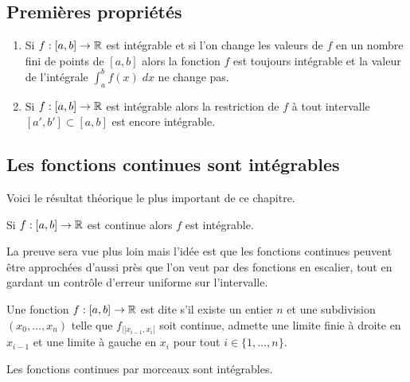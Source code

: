 \documentclass[class=report,crop=false]{standalone}
\begin{document}
\subsection{Premières propriétés}

\begin{proposition}
\label{prop:intprop}
\sauteligne
\begin{enumerate}
  \item Si $f : [a,b] \to \mathbb{R}$ est intégrable et si l'on change les valeurs de $f$
en un nombre fini de points de $[a,b]$ alors la fonction $f$ est
toujours intégrable et la valeur de l'intégrale $\int_a^b f(x)\; dx$ ne change pas.

  \item Si $f  : [a,b] \to \mathbb{R}$ est intégrable alors la restriction de $f$
à tout intervalle $[a',b'] \subset [a,b]$ est encore intégrable.
\end{enumerate}
\end{proposition}



\subsection{Les fonctions continues sont intégrables}

Voici le résultat théorique le plus important de ce chapitre.
\begin{theoreme}
\label{th:continueintegrable}
Si $f : [a,b] \to \mathbb{R}$ est continue alors $f$ est intégrable.
\end{theoreme}

La preuve sera vue plus loin mais l'idée est que les fonctions continues peuvent être
approchées d'aussi près que l'on veut par des fonctions en escalier, tout en gardant
un contrôle d'erreur uniforme sur l'intervalle.

\medskip

Une fonction $f : [a,b] \to \mathbb{R}$ est dite  s'il existe un entier $n$ et
une subdivision $(x_0,\ldots,x_n)$ telle que $f_{|]x_{i-1},x_i[}$ soit continue, admette une limite finie à droite en $x_{i-1}$ et une limite à gauche en $x_{i}$ pour tout $i \in \{ 1,\ldots,n \}$.


\begin{corollaire}
Les fonctions continues par morceaux sont intégrables.
\end{corollaire}
\end{document}
